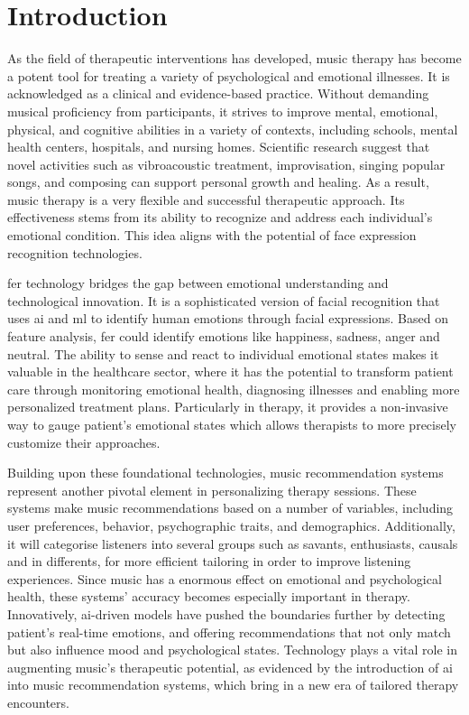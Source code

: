 \section{Introduction}
As the field of therapeutic interventions has developed, music therapy has become a potent tool for treating a variety of psychological and emotional illnesses. \citep{americanmusictherapyassociation_2005_what}
It is acknowledged as a clinical and evidence-based practice. Without demanding musical proficiency from participants, it strives to improve mental, emotional, physical, and cognitive abilities in a variety of contexts, including schools, mental health centers, hospitals, and nursing homes. \citep{clevelandclinic_2020_music}
Scientific research suggest that novel activities such as vibroacoustic treatment, improvisation, singing popular songs, and composing can support personal growth and healing. \citep{craig_2019_what}
As a result, music therapy is a very flexible and successful therapeutic approach. 
Its effectiveness stems from its ability to recognize and address each individual's emotional condition. 
This idea aligns with the potential of face expression recognition technologies.

\gls{fer} technology bridges the gap between emotional understanding and technological innovation.
It is a sophisticated version of facial recognition that uses \gls{ai} and \gls{ml} to identify human emotions through facial expressions.
Based on feature analysis, \gls{fer} could identify emotions like happiness, sadness, anger and neutral. \citep{huang_2023_a}
The ability to sense and react to individual emotional states makes it valuable in the healthcare sector, where it has the potential to transform patient care through monitoring emotional health, diagnosing illnesses and enabling more personalized treatment plans.
Particularly in therapy, it provides a non-invasive way to gauge patient's emotional states which allows therapists to more precisely customize their approaches. \citep{zharovskikh_2020_how}

Building upon these foundational technologies, music recommendation systems represent another pivotal element in personalizing therapy sessions. 
These systems make music recommendations based on a number of variables, including user preferences, behavior, psychographic traits, and demographics. 
Additionally, it will categorise listeners into several groups such as savants, enthusiasts, causals and in differents, for more efficient tailoring in order to improve listening experiences. \citep{song_2012_a}
Since music has a enormous effect on emotional and psychological health, these systems' accuracy becomes especially important in therapy. \citep{schedl_2021_music}
Innovatively, \gls{ai}-driven models have pushed the boundaries further by detecting patient's real-time emotions, and offering recommendations that not only match but also influence mood and psychological states. \citep{babu2023emotionaware}
Technology plays a vital role in augmenting music's therapeutic potential, as evidenced by the introduction of \gls{ai} into music recommendation systems, which bring in a new era of tailored therapy encounters.


